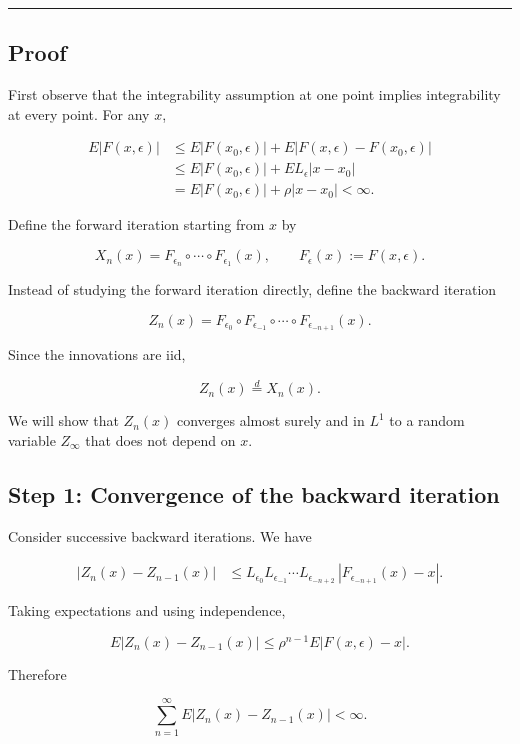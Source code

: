\begin{center}\rule{0.5\linewidth}{0.5pt}\end{center}

\subsection*{Proof}
First observe that the integrability assumption at one point implies integrability at every point. For any \(x\),

\[\begin{aligned}
E|F(x,\epsilon)|
&\le
E|F(x_0,\epsilon)|
+
E|F(x,\epsilon)-F(x_0,\epsilon)|\\
&\le
E|F(x_0,\epsilon)|
+
EL_\epsilon|x-x_0|\\
&=
E|F(x_0,\epsilon)|+\rho|x-x_0|
<\infty.
\end{aligned}\]

Define the forward iteration starting from \(x\) by

\[X_n(x)
=
F_{\epsilon_n}\circ\cdots\circ F_{\epsilon_1}(x),
\qquad
F_\epsilon(x):=F(x,\epsilon).\]

Instead of studying the forward iteration directly, define the backward iteration

\[Z_n(x)
=
F_{\epsilon_0}\circ F_{\epsilon_{-1}}
\circ\cdots\circ F_{\epsilon_{-n+1}}(x).\]

Since the innovations are iid,

\[Z_n(x)\overset d=X_n(x).\]

We will show that \(Z_n(x)\) converges almost surely and in \(L^1\) to a random variable \(Z_\infty\) that does not depend on \(x\).

\subsection*{Step 1: Convergence of the backward iteration}
Consider successive backward iterations. We have

\[\begin{aligned}
|Z_n(x)-Z_{n-1}(x)|
&\le
L_{\epsilon_0}L_{\epsilon_{-1}}\cdots
L_{\epsilon_{-n+2}}
\,|F_{\epsilon_{-n+1}}(x)-x|.
\end{aligned}\]

Taking expectations and using independence,

\[E|Z_n(x)-Z_{n-1}(x)|
\le
\rho^{n-1}E|F(x,\epsilon)-x|.\]

Therefore

\[\sum_{n=1}^\infty
E|Z_n(x)-Z_{n-1}(x)|
<\infty.\]

